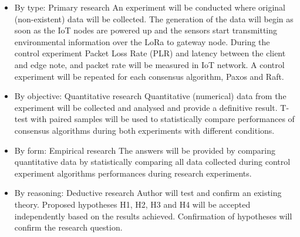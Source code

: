 \documentclass[oneside,12pt]{book}
\begin{document}
\begin{itemize}
  \item By type: Primary research\smallskip \newline
    An experiment will be conducted where original (non-existent) data will be collected. The generation of the data will begin as soon as the IoT nodes are powered up and the sensors start transmitting environmental information over the LoRa to gateway node. During the control experiment Packet Loss Rate (PLR) and latency between the client and edge note, and packet rate will be measured in IoT network. A control experiment will be repeated for each consensus algorithm, Paxos and Raft.
  
  \item By objective: Quantitative research\smallskip \newline
    Quantitative (numerical) data from the experiment will be collected and analysed and provide a definitive result. T-test with paired samples will be used to statistically compare performances of consensus algorithms during both experiments with different conditions. 
  
   \item By form: Empirical research\smallskip \newline
    The answers will be provided by comparing quantitative data by statistically comparing all data collected during control experiment algorithms performances during research experiments.
   
   \item By reasoning: Deductive research\smallskip \newline
    Author will test and confirm an existing theory. Proposed hypotheses H1, H2, H3 and H4 will be accepted independently based on the results achieved. Confirmation of hypotheses will confirm the research question.
\end{itemize}
\end{document}
